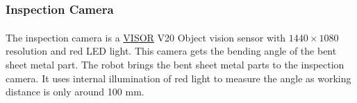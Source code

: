 \subsubsection{Inspection Camera}
\label{subsubsec:inspection-camera}
The inspection camera is a \hyperref[acro:VISOR]{VISOR}\textsuperscript{\textregistered} V20 Object vision sensor with $1440 \times 1080$ resolution and red LED light.
\cite{visor-object}
This camera gets the bending angle
of the bent sheet metal part. The robot brings the bent sheet metal parts to the inspection camera. 
It uses internal illumination of red light to measure the angle as working distance is only around 100 mm. 